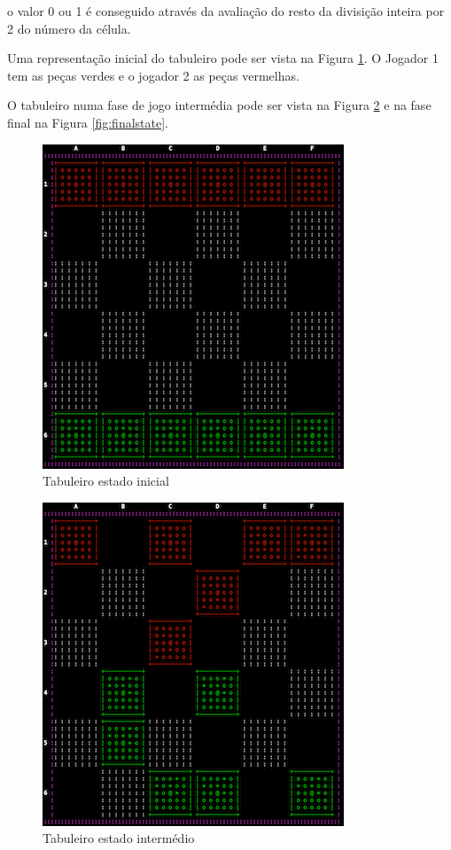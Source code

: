\documentclass[paper=a4, fontsize=11pt]{scrartcl} %
\numberwithin{equation}{section} %
\numberwithin{figure}{section} %
\numberwithin{table}{section} %
\begin{document}
o valor 0 ou 1 é conseguido através da avaliação do resto da divisição inteira por 2 do número da célula.

Uma representação inicial do tabuleiro pode ser vista na Figura \ref{fig:initstate}. O Jogador 1 tem as peças verdes e o jogador 2 as peças vermelhas.

O tabuleiro numa fase de jogo intermédia pode ser vista na Figura \ref{fig:middlestate} e na fase final na Figura \ref{fig:finalstate}.

\begin{figure}[tb]
	\centering
	\includegraphics{tabuleiro_init}
	\caption[PROLOG: tabuleiro estado inicial]{Tabuleiro estado inicial} %
	\label{fig:initstate} 
\end{figure}

\begin{figure}[tb]
	\centering
	\includegraphics{tabuleiro_middle}
	\caption[PROLOG: tabuleiro estado intermédio]{Tabuleiro estado intermédio} %
	\label{fig:middlestate} 
\end{figure}
\end{document}
